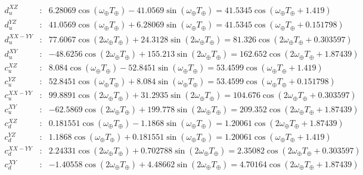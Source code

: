 \begin{eqnarray}
  d_u^{XZ} &:& 6.28069 \cos(\omega_\oplus T_\oplus)-41.0569 \sin(\omega_\oplus T_\oplus) 
               = 41.5345 \cos (\omega_\oplus T_\oplus+ 1.419) \label{eq:duXZ}\\
  d_u^{YZ} &:& 41.0569 \cos(\omega_\oplus T_\oplus)+6.28069 \sin(\omega_\oplus T_\oplus)   
               = 41.5345 \cos (\omega_\oplus T_\oplus+ 0.151798) \label{eq:duYZnum}       \\
  d_u^{XX-YY} &:& 77.6067 \cos(2\omega_\oplus T_\oplus )+24.3128 \sin(2\omega_\oplus T_\oplus ) 
               = 81.326 \cos (2 \omega_\oplus T_\oplus+ 0.303597)  \\
  d_u^{XY} &:& -48.6256 \cos(2\omega_\oplus T_\oplus )+155.213 \sin(2\omega_\oplus T_\oplus )
               = 162.652 \cos (2 \omega_\oplus T_\oplus+ 1.87439)  \\
  c_u^{XZ} &:& 8.084 \cos(\omega_\oplus T_\oplus)-52.8451 \sin(\omega_\oplus T_\oplus)            
                 = 53.4599 \cos (\omega_\oplus T_\oplus+ 1.419) \\
  c_u^{YZ} &:& 52.8451 \cos(\omega_\oplus T_\oplus)+8.084 \sin(\omega_\oplus T_\oplus)            
               = 53.4599 \cos (\omega_\oplus T_\oplus+ 0.151798)      \\
  c_u^{XX-YY} &:& 99.8891 \cos(2\omega_\oplus T_\oplus )+31.2935 \sin(2 \omega_\oplus T_\oplus)  
                 = 104.676 \cos (2 \omega_\oplus T_\oplus+ 0.303597)  \\
  c_u^{XY} &:& -62.5869 \cos(2\omega_\oplus T_\oplus )+199.778 \sin(2\omega_\oplus T_\oplus )      
                 = 209.352 \cos (2 \omega_\oplus T_\oplus+ 1.87439)  \\
  c_d^{XZ} &:& 0.181551 \cos(\omega_\oplus T_\oplus)-1.1868 \sin(\omega_\oplus T_\oplus)           
                 = 1.20061 \cos (2 \omega_\oplus T_\oplus+ 1.87439)  \\
  c_d^{YZ} &:& 1.1868 \cos(\omega_\oplus T_\oplus)+0.181551 \sin(\omega_\oplus T_\oplus)           
                   = 1.20061 \cos (\omega_\oplus T_\oplus+ 1.419) \\
  c_d^{XX-YY} &:& 2.24331 \cos(2\omega_\oplus T_\oplus )+0.702788 \sin(2 \omega_\oplus T_\oplus) 
                   = 2.35082 \cos (2 \omega_\oplus T_\oplus+ 0.303597)  \\
  c_d^{XY} &:& -1.40558 \cos(2\omega_\oplus T_\oplus )+4.48662 \sin(2 \omega_\oplus T_\oplus) 
                   = 4.70164 \cos (2 \omega_\oplus T_\oplus+ 1.87439)  \\
  \label{eq:cdXY}   
\end{eqnarray}
